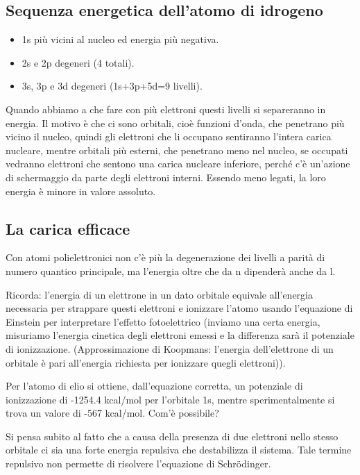 \subsection{Sequenza energetica dell'atomo di idrogeno}
\begin{itemize}
  \item 1s più vicini al nucleo ed energia più negativa.
  \item 2s e 2p degeneri (4 totali).
  \item 3s, 3p e 3d degeneri (1s+3p+5d=9 livelli).
\end{itemize}
Quando abbiamo a che fare con più elettroni questi livelli si separeranno in energia. Il motivo è che ci sono orbitali, cioè funzioni d'onda, che penetrano più vicino il nucleo, quindi gli elettroni che li occupano sentiranno l'intera carica nucleare, mentre orbitali più esterni, che penetrano meno nel nucleo, se occupati vedranno elettroni che sentono una carica nucleare inferiore, perché c'è un'azione di schermaggio da parte degli elettroni interni. Essendo meno legati, la loro energia è minore in valore assoluto.
\subsection{La carica efficace}
Con atomi polielettronici non c'è più la degenerazione dei livelli a parità di numero quantico principale, ma l'energia oltre che da n dipenderà anche da l.

\vspace{0.2cm}Ricorda: l'energia di un elettrone in un dato orbitale  equivale all'energia necessaria per strappare questi elettroni e ionizzare l'atomo usando l'equazione di Einstein per interpretare l'effetto fotoelettrico (inviamo una certa energia, misuriamo l'energia cinetica degli elettroni emessi e la differenza sarà il potenziale di ionizzazione. (Approssimazione di Koopmans: l'energia dell'elettrone di un orbitale è pari all'energia richiesta per ionizzare quegli elettroni)).

\vspace{0.2cm}Per l'atomo di elio si ottiene, dall'equazione corretta, un potenziale di ionizzazione di -1254.4 kcal/mol per l'orbitale 1s, mentre sperimentalmente si trova un valore di -567 kcal/mol. Com'è possibile?

Si pensa subito al fatto che a causa della presenza di due elettroni nello stesso orbitale ci sia una forte energia repulsiva che destabilizza il sistema. Tale termine repulsivo non permette di risolvere l'equazione di Schrödinger.

